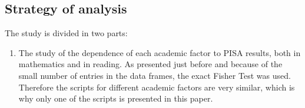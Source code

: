 \documentclass[12pt,a4paper]{article}
\begin{document}
\subsection{Strategy of analysis}

The study is divided in two parts:
\begin{enumerate}
	\item The study of the dependence of each academic factor to PISA results, both in mathematics and in reading. As presented just before and because of the small number of entries in the data frames, the exact Fisher Test was used. Therefore the scripts for different academic factors are very similar, which is why only one of the scripts is presented in this paper.
\end{enumerate}
\end{document}
